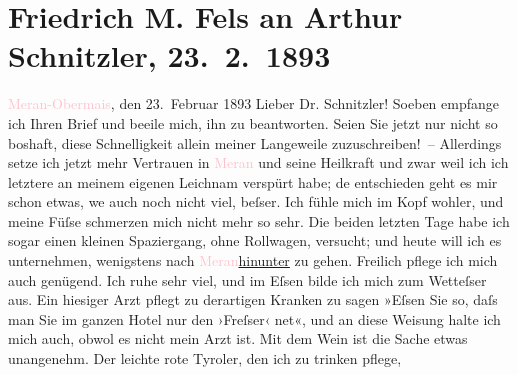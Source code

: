 

               \section[Friedrich M. Fels an Arthur Schnitzler, 23. 2. 1893]{ Friedrich M. Fels an Arthur Schnitzler, 23. 2. 1893}\nopagebreak{}\rehead{ }\normalsize\beginnumbering{} \toendnotes[C]{\smallbreak\pagebreak[2]} 
\toendnotes[C]{\smallbreak}\pstart
           \raggedleft{}{\pb}\textcolor{pink}{Meran-Obermais}{}\ledrightnote{\textcolor{pink}{Obermais}}, den 23. Februar
                     1893\pend
           \pstart\center{}Lieber Dr. Schnitzler!\pend\pstart
           Soeben empfange ich Ihren Brief und beeile mich, ihn zu beantworten. Seien Sie jetzt
               nur nicht so boshaft, diese Schnelligkeit allein meiner Langeweile
               zuzuschreiben! –\pend
           \pstart
           Allerdings setze ich jetzt mehr Vertrauen in \textcolor{pink}{Meran}{}\ledrightnote{\textcolor{pink}{Meran}}
               und seine Heilkraft und zwar weil ich ich letztere an meinem eigenen Leichnam
               verspürt habe; de{\geminationn} entschieden geht es mir schon etwas,
                  we{\geminationn} auch noch nicht viel, beſser. Ich fühle mich im
               Kopf wohler, und meine Füſse schmerzen mich nicht mehr so sehr. Die beiden letzten
               Tage habe ich sogar einen kleinen Spaziergang, ohne Rollwagen, versucht; und heute
               will ich es unternehmen, wenigstens nach \textcolor{pink}{Meran}{}\ledrightnote{\textcolor{pink}{Meran}}{ }\uline{hinunter} zu gehen.\pend
           \pstart
           Freilich pflege ich mich auch genügend. Ich ruhe sehr viel, und im Eſsen bilde ich
               mich zum Wetteſser aus. Ein hiesiger Arzt pflegt zu derartigen Kranken zu sagen
               »Eſsen Sie so, daſs man Sie im ganzen Hotel nur den ›Freſser‹ ne{\geminationn}t«, und an diese Weisung halte ich mich auch, obwol es
               nicht mein Arzt ist. Mit dem Wein ist die Sache etwas unangenehm. {\pb}Der leichte rote Tyroler, den ich zu trinken pflege,
